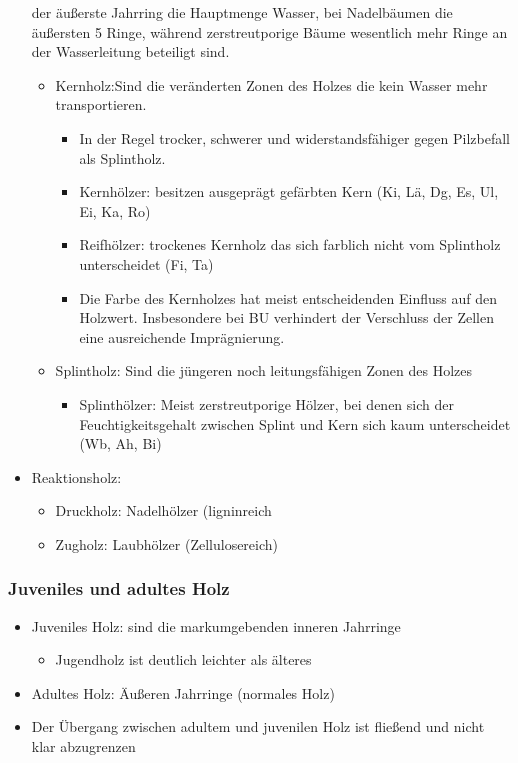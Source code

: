 \documentclass[12pt]{article}
\begin{document}
\begin{itemize}
  der äußerste Jahrring die Hauptmenge Wasser, bei Nadelbäumen die äußersten 5
  Ringe, während zerstreutporige Bäume wesentlich mehr Ringe an der
  Wasserleitung beteiligt sind.
  \begin{itemize}
    \item Kernholz:Sind die veränderten Zonen des Holzes die kein Wasser
    mehr transportieren.
    \begin{itemize}
      \item In der Regel trocker, schwerer und widerstandsfähiger gegen
      Pilzbefall als Splintholz.
      \item Kernhölzer: besitzen ausgeprägt gefärbten Kern (Ki, Lä, Dg, Es, Ul,
      Ei, Ka, Ro)
      \item Reifhölzer: trockenes Kernholz das sich farblich nicht vom
      Splintholz unterscheidet (Fi, Ta)
      \item Die Farbe des Kernholzes hat meist entscheidenden Einfluss auf den
      Holzwert. Insbesondere bei BU verhindert der Verschluss der Zellen eine
      ausreichende Imprägnierung.
    \end{itemize}
  \end{itemize}
  \begin{itemize}
    \item Splintholz: Sind die jüngeren noch leitungsfähigen Zonen des Holzes 
    \begin{itemize}
      \item Splinthölzer: Meist zerstreutporige Hölzer, bei denen sich der
      Feuchtigkeitsgehalt zwischen  Splint und Kern sich kaum unterscheidet (Wb, Ah, Bi)
      \end{itemize}
  \end{itemize}
  \item Reaktionsholz:
  \begin{itemize}
    \item Druckholz: Nadelhölzer (ligninreich
    \item Zugholz: Laubhölzer (Zellulosereich)
    \end{itemize}
\end{itemize}
 
\subsubsection{Juveniles und adultes Holz}
\begin{itemize}
  \item Juveniles Holz: sind die markumgebenden inneren Jahrringe
  \begin{itemize}
    \item Jugendholz ist deutlich leichter als älteres
  \end{itemize}
  \item Adultes Holz: Äußeren Jahrringe (normales Holz)
  \item Der Übergang zwischen adultem und juvenilen Holz ist fließend und
  nicht klar abzugrenzen
\end{itemize}
\end{document}
